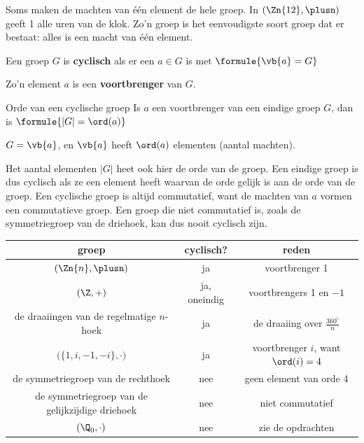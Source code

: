 Soms maken de machten van één element de hele groep. In $(\Zn{12}, \plusn)$ geeft 1 alle uren van de klok. Zo'n groep is het eenvoudigste soort groep dat er bestaat: alles is een macht van één element.

\begin{theorie}
Een groep $G$ is \textbf{\textcolor{accent}{cyclisch}} als er een $a \in G$ is met \quad $\formule{\vb{a} = G}$

\vspace{1mm}
Zo'n element $a$ is een \textbf{\textcolor{accent}{voortbrenger}} van $G$.

\begin{stelling}{Orde van een cyclische groep}
Is $a$ een voortbrenger van een eindige groep $G$, dan is \qquad $\formule{|G| = \ord(a)}$
\end{stelling}

\begin{bewijs}
$G = \vb{a}$, en $\vb{a}$ heeft $\ord(a)$ elementen (aantal machten).
\end{bewijs}
\end{theorie}

Het aantal elementen $|G|$ heet ook hier de orde van de groep. Een eindige groep is dus cyclisch als ze een element heeft waarvan de orde gelijk is aan de orde van de groep. Een cyclische groep is altijd commutatief, want de machten van $a$ vormen een commutatieve groep. Een groep die niet commutatief is, zoals de symmetriegroep van de driehoek, kan dus nooit cyclisch zijn.

\begin{center}
\renewcommand{\arraystretch}{1.3}
\begin{tabular}{|c|c|c|}
\hline
\rowcolor{accent!14} groep & cyclisch? & reden \\ \hline
$(\Zn{n}, \plusn)$ & ja & voortbrenger 1 \\ \hline
$(\Z, +)$ & ja, oneindig & voortbrengers 1 en $-1$ \\ \hline
de draaiingen van de regelmatige $n$-hoek & ja & de draaiing over $\frac{360^\circ}{n}$ \\ \hline
$\bigl(\{1, i, -1, -i\}, \cdot\bigr)$ & ja & voortbrenger $i$, want $\ord(i) = 4$ \\ \hline
de symmetriegroep van de rechthoek & nee & geen element van orde 4 \\ \hline
de symmetriegroep van de gelijkzijdige driehoek & nee & niet commutatief \\ \hline
$(\Q_0, \cdot)$ & nee & zie de opdrachten \\ \hline
\end{tabular}
\end{center}

